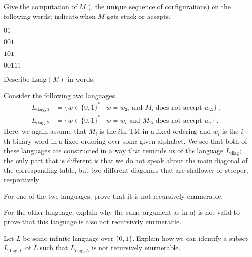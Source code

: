 \documentclass{exercise}
\begin{document}
\subtask Give the computation of $M$ (\ie, the unique sequence of configurations) on
  the following words; indicate when $M$ gets stuck or accepts.

  \begin{taskitems}
    \item $01$
    \item $001$
    \item $101$
    \item $00111$
  \end{taskitems}


\subtask Describe $\text{Lang}(M)$ in words.



Consider the following two languages.
\begin{align*}
  L_{\text{diag},1} &= \{ w\in\{0,1\}^* \mid w = w_{2i} \text{ and } M_i \text{ does not accept } w_{2i} \}\;,\\
  L_{\text{diag},2} &= \{ w\in\{0,1\}^* \mid w = w_i \text{ and } M_{2i} \text{ does not accept } w_i \}\;.
\end{align*}
Here, we again assume that $M_i$ is the $i$th TM in a fixed ordering
and $w_i$ is the $i$th binary word in a fixed ordering over some given alphabet.
We see that both of these languages are constructed in a way that reminds us
of the language $L_{\text{diag}}$; the only part that is different is that we
do not speak about the main diagonal of the corresponding table, but two different
diagonals that are shallower or steeper, respectively.

\subtask For one of the two languages, prove that it is not recursively enumerable.


\subtask For the other language, explain why the same argument as in a) is not
  valid to prove that this language is also not recursively enumerable.



Let $L$ be some infinite language over $\{0,1\}$.  Explain how we can
identify a subset $L_{\text{diag},L}$ of $L$ such that $L_{\text{diag},L}$
is not recursively enumerable.


\end{document}
